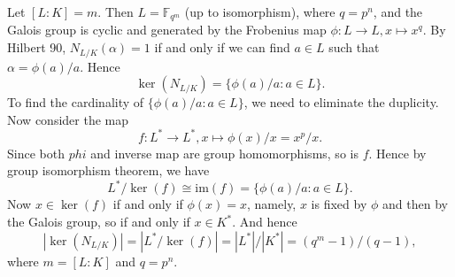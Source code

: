 \documentclass[12pt,reqno]{article}
\theoremstyle{definition}
\newcommand{\ff}{\mathbb{F}}
\newcommand{\im}{\mbox{im}}
\begin{document}
\begin{solution}{7}
	Let $[L:K]=m$. Then $L=\ff_{q^m}$ (up to isomorphism), where $q=p^n$, and the Galois group is cyclic and generated by the Frobenius map $\phi: L\to L, x\mapsto x^q$.
	By Hilbert 90, $N_{L/K}(\alpha)=1$ if and only if we can find $a\in L$ such that $\alpha=\phi(a)/a$. Hence $$\ker(N_{L/K})=\{\phi(a)/a: a\in L\}.$$ To find the cardinality of $\{\phi(a)/a: a\in L\}$, we need to eliminate the duplicity. Now consider the map $$f: L^*\to L^*, x\mapsto \phi(x)/x=x^p/x.$$ Since both $phi$ and inverse map are group homomorphisms, so is $f$. Hence by group isomorphism theorem, we have $$L^*/\ker(f) \cong \im(f) = \{\phi(a)/a: a\in L\}.$$ Now $x\in \ker(f)$ if and only if $\phi(x)=x$, namely, $x$ is fixed by $\phi$ and then by the Galois group, so if and only if $x\in K^*$. And hence $$|\ker(N_{L/K})|=  |L^*/\ker(f)| = |L^*|/|K^*| = (q^m-1)/(q-1),$$ where $m=[L:K]$ and $q=p^n$.
\end{solution}
\end{document}
